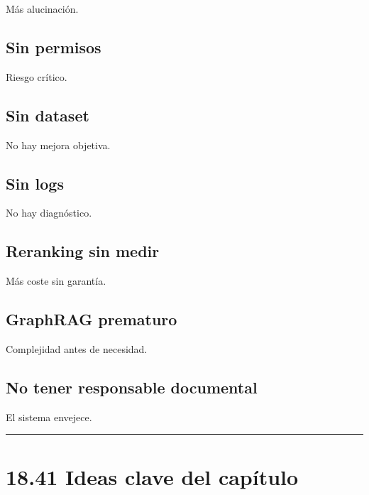 Más alucinación.

\subsection{Sin permisos}\label{sin-permisos-1}

Riesgo crítico.

\subsection{Sin dataset}\label{sin-dataset}

No hay mejora objetiva.

\subsection{Sin logs}\label{sin-logs-1}

No hay diagnóstico.

\subsection{Reranking sin medir}\label{reranking-sin-medir}

Más coste sin garantía.

\subsection{GraphRAG prematuro}\label{graphrag-prematuro}

Complejidad antes de necesidad.

\subsection{No tener responsable
documental}\label{no-tener-responsable-documental}

El sistema envejece.

\begin{center}\rule{0.5\linewidth}{0.5pt}\end{center}

\section{18.41 Ideas clave del
capítulo}\label{ideas-clave-del-capuxedtulo-17}

